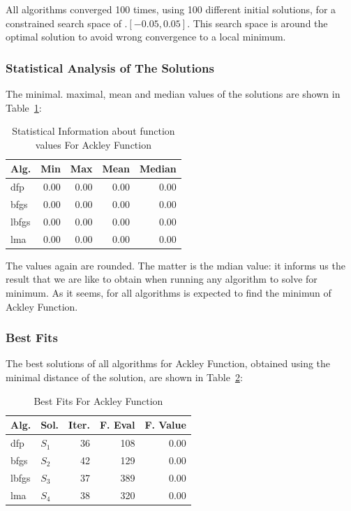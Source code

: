 \documentclass[conference]{IEEEtran}
\begin{document}
All algorithms converged 100 times, using 100 different initial solutions,
for a constrained search space of .$[-0.05, 0.05]$. This search space is around
the optimal solution to avoid wrong convergence to a local minimum.



\subsubsection{Statistical Analysis of The Solutions}
\label{statisticalanalysisackley2D}

The minimal. maximal, mean and median values of the solutions are shown in Table~\ref{function_values:ackley}:

\begin{table}[H]
\centering
\caption{Statistical Information about function values For Ackley Function}
\label{function_values:ackley}
\begin{tabular}{lrrrr}
\toprule
 Alg. &  Min &  Max &  Mean &  Median \\
\midrule
  dfp & 0.00 & 0.00 &  0.00 &    0.00 \\
 bfgs & 0.00 & 0.00 &  0.00 &    0.00 \\
lbfgs & 0.00 & 0.00 &  0.00 &    0.00 \\
  lma & 0.00 & 0.00 &  0.00 &    0.00 \\
\bottomrule
\end{tabular}
\end{table}

The values again are rounded. The matter is the mdian value: it informs us the result that
we are like to obtain when running any algorithm to solve for minimum. As it seems, for all
algorithms is expected to find the minimun of Ackley Function.


\subsubsection{Best Fits}
\label{bestfitsackley2D}

The best solutions of all algorithms for Ackley Function, obtained using the minimal
distance of the solution, are shown in Table~\ref{solutions:ackley}:

\begin{table}[H]
\centering
\caption{Best Fits For Ackley Function}
\label{solutions:ackley}
\begin{tabular}{llrrr}
\toprule
 Alg. &    Sol. &  Iter. &  F. Eval &  F. Value \\
\midrule
  dfp & $S_{1}$ &     36 &      108 &      0.00 \\
 bfgs & $S_{2}$ &     42 &      129 &      0.00 \\
lbfgs & $S_{3}$ &     37 &      389 &      0.00 \\
  lma & $S_{4}$ &     38 &      320 &      0.00 \\
\bottomrule
\end{tabular}
\end{table}
\end{document}

